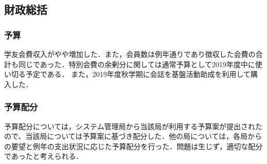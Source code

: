 \subsection*{財政総括}

\subsubsection*{予算}
学友会費収入がやや増加した．また，会員数は例年通りであり徴収した会費の合計も同じであった．特別会費の余剰分に関しては通常予算として2019年度中に使い切る予定である．
また，2019年度秋学期に会誌を基盤活動助成を利用して購入した．

\subsubsection*{予算配分}
予算配分については，システム管理局から当該局が利用する予算案が提出されたので、当該局については予算案に基づき配分した．他の局については，各局からの要望と例年の支出状況に応じた予算配分を行った．問題は生じず，適切な配分であったと考えられる．